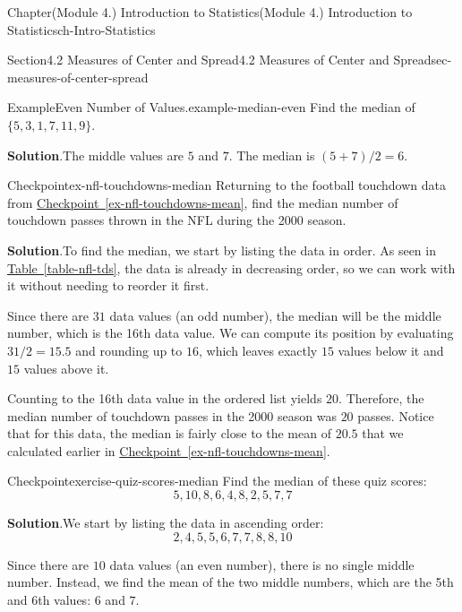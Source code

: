 \documentclass[oneside,10pt,]{book}
\newcommand{\blocktitlefont}{\relax}
\newcommand{\xreffont}{\relax}
\begin{document}
\begin{chapterptx}{Chapter}{(Module 4.) Introduction to Statistics}{}{(Module 4.) Introduction to Statistics}{}{}{ch-Intro-Statistics}
\begin{sectionptx}{Section}{4.2 Measures of Center and Spread}{}{4.2 Measures of Center and Spread}{}{}{sec-measures-of-center-spread}
\begin{example}{Example}{Even Number of Values.}{example-median-even}
Find the median of \(\{5, 3, 1, 7, 11, 9\}\).%
\par\smallskip%
\noindent\textbf{\blocktitlefont Solution}.\hypertarget{example-median-even-3}{}\quad{}The middle values are \(5\) and \(7\). The median is \((5 + 7)/2 = 6\).%
\end{example}
\begin{inlineexercise}{Checkpoint}{}{ex-nfl-touchdowns-median}%
Returning to the football touchdown data from \hyperref[ex-nfl-touchdowns-mean]{Checkpoint~{\xreffont\ref{ex-nfl-touchdowns-mean}}}, find the median number of touchdown passes thrown in the NFL during the 2000 season.%
\par\smallskip%
\noindent\textbf{\blocktitlefont Solution}.\hypertarget{ex-nfl-touchdowns-median-2}{}\quad{}To find the median, we start by listing the data in order. As seen in \hyperref[table-nfl-tds]{Table~{\xreffont\ref{table-nfl-tds}}}, the data is already in decreasing order, so we can work with it without needing to reorder it first.%
\par
Since there are \(31\) data values (an odd number), the median will be the middle number, which is the 16th data value. We can compute its position by evaluating \(31/2 = 15.5\) and rounding up to \(16\), which leaves exactly \(15\) values below it and \(15\) values above it.%
\par
Counting to the 16th data value in the ordered list yields \(20\). Therefore, the median number of touchdown passes in the 2000 season was \(20\) passes. Notice that for this data, the median is fairly close to the mean of \(20.5\) that we calculated earlier in \hyperref[ex-nfl-touchdowns-mean]{Checkpoint~{\xreffont\ref{ex-nfl-touchdowns-mean}}}.%
\end{inlineexercise}%
\begin{inlineexercise}{Checkpoint}{}{exercise-quiz-scores-median}%
Find the median of these quiz scores:%
\begin{equation*}
5, 10, 8, 6, 4, 8, 2, 5, 7, 7
\end{equation*}
%
\par\smallskip%
\noindent\textbf{\blocktitlefont Solution}.\hypertarget{exercise-quiz-scores-median-2}{}\quad{}We start by listing the data in ascending order:%
\begin{equation*}
2, 4, 5, 5, 6, 7, 7, 8, 8, 10
\end{equation*}
%
\par
Since there are \(10\) data values (an even number), there is no single middle number. Instead, we find the mean of the two middle numbers, which are the 5th and 6th values: \(6\) and \(7\).%

\end{inlineexercise}
\end{sectionptx}
\end{chapterptx}
\end{document}
